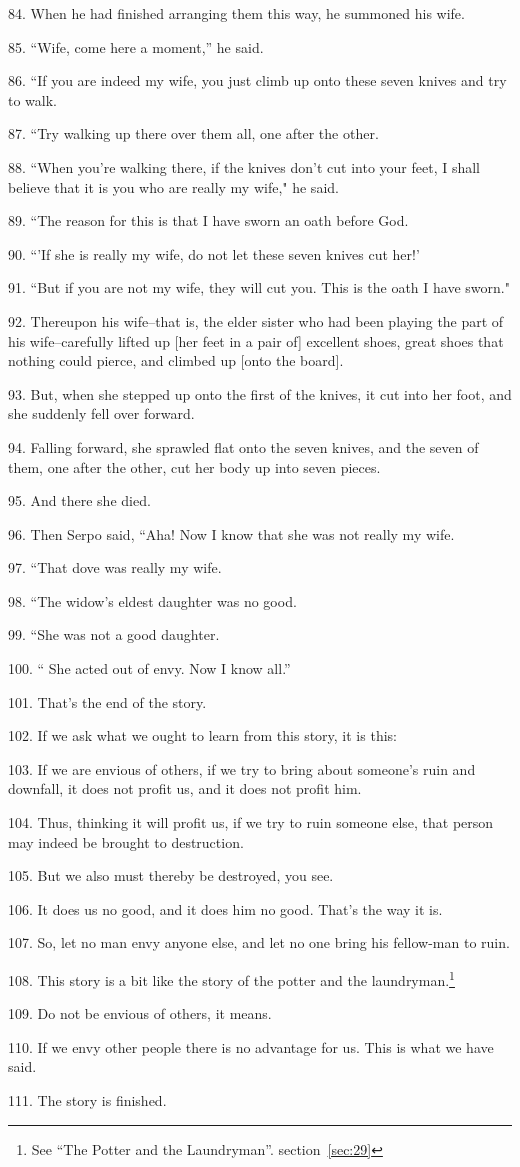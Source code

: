 84. When he had finished arranging them this way, he summoned his wife.

85. ``Wife, come here a moment,'' he said.

86. ``If you are indeed my wife, you just climb up onto these seven knives
and try to walk.

87. ``Try walking up there over them all, one after the other.

88. ``When you're walking there, if the knives don't cut into your feet,
I shall believe that it is you who are really my wife," he said.

89. ``The reason for this is that I have sworn an oath before God.

90. ``'If she is really my wife, do not let these seven knives cut her!'

91. ``But if you are not my wife, they will cut you. This is the oath
I have sworn."

92. Thereupon his wife--that is, the elder sister who had been playing the part
of his wife--carefully lifted up [her feet in a pair of] excellent shoes, great
shoes that nothing could pierce, and climbed up [onto the board].

93. But, when she stepped up onto the first of the knives, it cut into her foot,
and she suddenly fell over forward.

94. Falling forward, she sprawled flat onto the seven knives, and the seven of
them, one after the other, cut her body up into seven pieces.

95. And there she died.

96. Then Serpo said, ``Aha! Now I know that she was not really my wife.

97. ``That dove was really my wife.

98. ``The widow's eldest daughter was no good.

99. ``She was not a good daughter.

100. `` She acted out of envy. Now I know all.''

101. That's the end of the story.

102. If we ask what we ought to learn from this story, it is this:

103. If we are envious of others, if we try to bring about someone's ruin and downfall,
it does not profit us, and it does not profit him.

104. Thus, thinking it will profit us, if we try to ruin someone else, that person
may indeed be brought to destruction.

105. But we also must thereby be destroyed, you see.

106. It does us no good, and it does him no good. That's the way it is.

107. So, let no man envy anyone else, and let no one bring his fellow-man to ruin.

108. This story is a bit like the story of the potter and the laundryman.\footnote{See ``The Potter and the Laundryman''. section~\ref{sec:29}}

109. Do not be envious of others, it means.

110. If we envy other people there is no advantage for us. This is what we have
said.

111. The story is finished.

